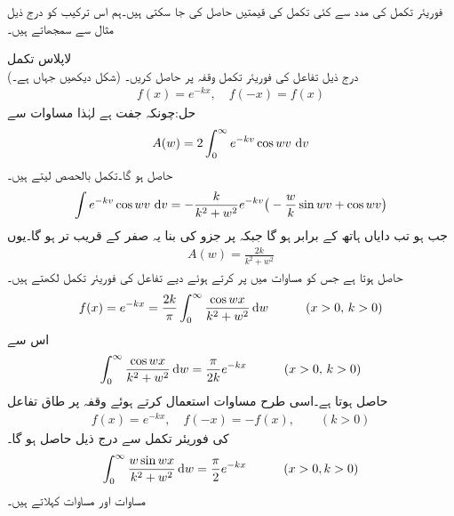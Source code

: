 فوریئر تکمل کی  مدد سے کئی  تکمل کی قیمتیں حاصل کی جا سکتی ہیں۔ہم اس ترکیب کو درج ذیل مثال سے سمجھاتے  ہیں۔

\quad لاپلاس تکمل\\
درج ذیل تفاعل کی فوریئر تکمل وقفہ  پر حاصل کریں۔ (شکل  دیکھیں جہاں  ہے۔)
\begin{align*}
f(x)=e^{-kx}, \quad f(-x)=f(x)
\end{align*}
حل:چونکہ  جفت ہے لہٰذا مساوات  سے 
\begin{align*}
A(w)=2\int_0^{\infty} e^{-kv}\cos wv\,\dif v
\end{align*}
حاصل ہو گا۔تکمل بالحصص لیتے ہیں۔
\begin{align*}
\int e^{-kv}\cos wv\,\dif v=-\frac{k}{k^2+w^2}e^{-kv}\big(-\frac{w}{k}\sin wv+\cos wv\big)
\end{align*}
جب  ہو تب دایاں ہاتھ  کے برابر ہو گا جبکہ  پر  جزو کی بنا یہ صفر کے قریب تر ہو گا۔یوں
\begin{align*}
A(w)=\frac{2k}{k^2+w^2}
\end{align*}
حاصل ہوتا ہے جس کو مساوات  میں پر کرتے ہوئے دیے تفاعل کی فوریئر تکمل لکھتے ہیں۔
\begin{align*}
f(x)=e^{-kx}=\frac{2k}{\pi}\int_0^{\infty} \frac{\cos wx}{k^2+w^2}\dif w\quad \quad \quad (x>0,\, k>0)
\end{align*}
اس سے 
\begin{align}\label{مساوات_فوریئر_لاپلاس_تکمل_الف}
\int_0^{\infty} \frac{\cos wx}{k^2+w^2}\dif w=\frac{\pi}{2k}e^{-kx}\quad \quad \quad (x>0,\, k>0)
\end{align}
حاصل ہوتا ہے۔اسی طرح مساوات   استعمال کرتے ہوئے وقفہ  پر  طاق تفاعل
\begin{align*}
f(x)=e^{-kx},\quad f(-x)=-f(x), \quad \quad (k>0)
\end{align*}
 کی فوریئر تکمل سے  درج ذیل حاصل ہو گا۔
\begin{align}\label{مساوات_فوریئر_لاپلاس_تکمل_ب}
\int_0^{\infty} \frac{w\sin wx}{k^2+w^2}\dif w=\frac{\pi}{2}e^{-kx}\quad \quad \quad (x>0, k>0)
\end{align}
مساوات  اور مساوات   کہلاتے ہیں۔

